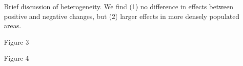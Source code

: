 \documentclass[12pt,a4paper]{article}
\begin{document}
%















Brief discussion of heterogeneity. We find (1) no difference in effects between positive and negative changes, but (2) larger effects in more densely populated areas. 

Figure 3

Figure 4




\end{document}
